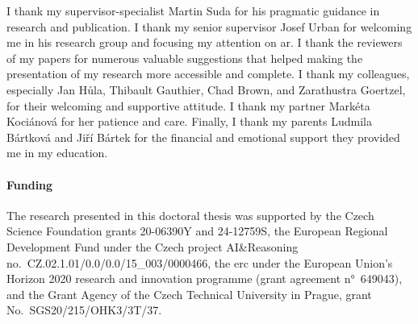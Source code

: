 \begin{thanks}
I thank my supervisor-specialist Martin Suda for his pragmatic guidance in research and publication.
I thank my senior supervisor Josef Urban for welcoming me in his research group and focusing my attention on \gls{ar}.
I thank the reviewers of my papers for numerous valuable suggestions that helped making the presentation of my research more accessible and complete.
I thank my colleagues, especially Jan Hůla, Thibault Gauthier, Chad Brown, and Zarathustra Goertzel, for their welcoming and supportive attitude.
I thank my partner Markéta Kociánová for her patience and care.
Finally, I thank my parents Ludmila Bártková and Jiří Bártek for the financial and emotional support they provided me in my education.

\paragraph{Funding}



The research presented in this doctoral thesis was supported by
the Czech Science Foundation grants 20-06390Y and 24-12759S,
the European Regional Development Fund under the Czech project AI\&Reasoning no.~CZ.02.1.01/0.0/0.0/15\_003/0000466,
the \gls{erc} under the European Union's Horizon 2020 research and innovation programme (grant agreement n°~649043), and
the Grant Agency of the Czech Technical University in Prague, grant No.~SGS20/215/OHK3/3T/37.
\end{thanks}

